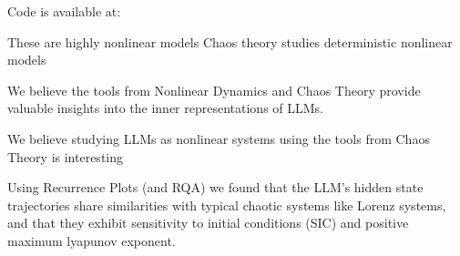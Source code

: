 Code is available at: 



These are highly nonlinear models
Chaos theory studies deterministic nonlinear models

We believe the tools from Nonlinear Dynamics and Chaos Theory provide valuable insights into the inner representations of LLMs.

We believe studying LLMs as nonlinear systems using the tools from Chaos Theory is interesting





Using Recurrence Plots (and RQA) we found that the LLM's hidden state trajectories share similarities with typical chaotic systems like Lorenz systems, and that they exhibit sensitivity to initial conditions (SIC) and positive maximum lyapunov exponent.











